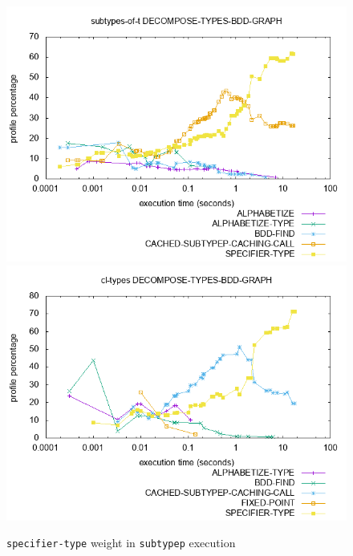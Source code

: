 \documentclass[format=sigconf]{acmart}
\newcommand\code[2][\small]{\sloppy\texttt{#1#2}}
\theoremstyle{definition}
\begin{document}
\newcommand\ststpscale{0.5}
\begin{figure}
  \centering
  \includegraphics[scale=\ststpscale]{assets/19/stGTstp}
  \includegraphics[scale=\ststpscale]{assets/19/stEQstp}
  \caption{\code{specifier-type} weight in \code{subtypep} execution}
  \label{fig:specifiertype}
\end{figure}
\end{document}
